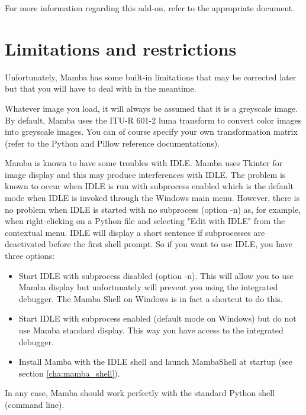 \documentclass[a4paper,10pt,oneside]{article}
\begin{document}
For more information regarding this add-on, refer to the appropriate document.

\pagebreak

\section{Limitations and restrictions}
\label{cha:lim_restrict}

Unfortunately, Mamba has some built-in limitations that may be corrected later
but that you will have to deal with in the meantime.

Whatever image you load, it will always be assumed that it is a greyscale image.
By default, Mamba uses the ITU-R 601-2 luma transform to convert color images 
into greyscale images. You can of course specify your own transformation matrix 
(refer to the Python and Pillow reference documentations).

Mamba is known to have some troubles with IDLE. Mamba uses
Tkinter for image display and this may produce interferences with IDLE. The
problem is known to occur when IDLE is run with subprocess enabled which is the
default mode when IDLE is invoked through the Windows main menu. However, there 
is no problem when IDLE is started with no subprocess (option -n) as, for 
example, when right-clicking on a Python file and selecting "Edit with IDLE" from
the contextual menu. IDLE will display a short sentence if subprocesses are
deactivated before the first shell prompt. So if you want to use IDLE, you have
three options:

\begin{itemize}
\item Start IDLE with subprocess disabled (option -n). This will allow you to 
use Mamba display but unfortunately will prevent you using the integrated
debugger. The Mamba Shell on Windows is in fact a shortcut to do this.
\item Start IDLE with subprocess enabled (default mode on Windows) but do not
use Mamba standard display. This way you have access to the integrated debugger.
\item Install Mamba with the IDLE shell and launch MambaShell at startup (see
section \ref{cha:mamba_shell}).
\end{itemize}

In any case, Mamba should work perfectly with the standard Python shell 
(command line).
\end{document}

